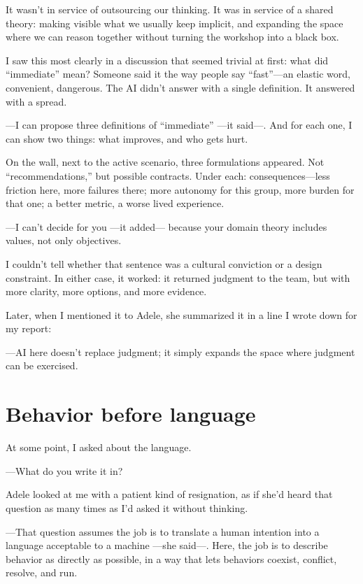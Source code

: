 \documentclass[11pt,a4paper]{article}
\begin{document}
It wasn't in service of outsourcing our thinking. It was in service of a
shared theory: making visible what we usually keep implicit, and expanding
the space where we can reason together without turning the workshop into a
black box.

I saw this most clearly in a discussion that seemed trivial at first: what
did ``immediate'' mean? Someone said it the way people say ``fast''---an
elastic word, convenient, dangerous. The AI didn't answer with a single
definition. It answered with a spread.

---I can propose three definitions of ``immediate'' ---it said---. And for
each one, I can show two things: what improves, and who gets hurt.

On the wall, next to the active scenario, three formulations appeared. Not
``recommendations,'' but possible contracts. Under each:
consequences---less friction here, more failures there; more autonomy for
this group, more burden for that one; a better metric, a worse lived
experience.

---I can't decide for you ---it added--- because your domain theory includes
values, not only objectives.

I couldn't tell whether that sentence was a cultural conviction or a design
constraint. In either case, it worked: it returned judgment to the team, but
with more clarity, more options, and more evidence.

Later, when I mentioned it to Adele, she summarized it in a line I wrote down
for my report:

---AI here doesn't replace judgment; it simply expands the space where
judgment can be exercised.

\section{Behavior before language}

At some point, I asked about the language.

---What do you write it in?

Adele looked at me with a patient kind of resignation, as if she'd heard that
question as many times as I'd asked it without thinking.

---That question assumes the job is to translate a human intention into a
language acceptable to a machine ---she said---. Here, the job is to describe
behavior as directly as possible, in a way that lets behaviors coexist,
conflict, resolve, and run.
\end{document}
